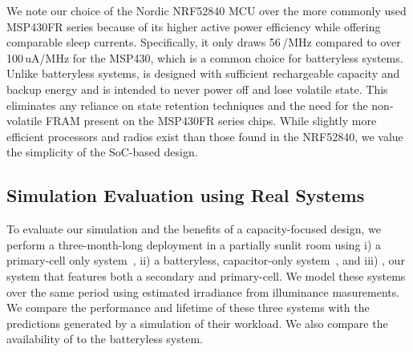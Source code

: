 We note our choice of the Nordic NRF52840 MCU over the more commonly used MSP430FR series
because of its higher active power efficiency while offering comparable sleep currents.
Specifically, it only draws 56\,\uA/MHz compared to over 100\,uA/MHz
for the MSP430, which is a common choice for batteryless systems. 
Unlike batteryless systems,
\name is designed with sufficient rechargeable capacity and backup energy and is intended to never power off and lose volatile state. 
This eliminates any reliance on state retention techniques and the need for the non-volatile FRAM present on the MSP430FR series chips. 
While
slightly more efficient
processors and radios exist than those found in the NRF52840,
we value the simplicity of the SoC-based design. 

\subsection{Simulation Evaluation using Real Systems}
\label{sec:eval}
To evaluate our simulation and the benefits of a capacity-focused design, 
we perform a three-month-long deployment in a partially sunlit room
using i) a primary-cell only system~\cite{adkins2015michigan}, ii) a batteryless, capacitor-only system~\cite{campbellEnergy14}, and iii) \name, our
system that features both a secondary and primary-cell. 
We model these
systems over the same period using estimated irradiance from \name illuminance masurements. 
We compare the performance and lifetime of these three systems with the predictions generated by a simulation of their workload. 
We also compare the availability of \name to the batteryless system.



